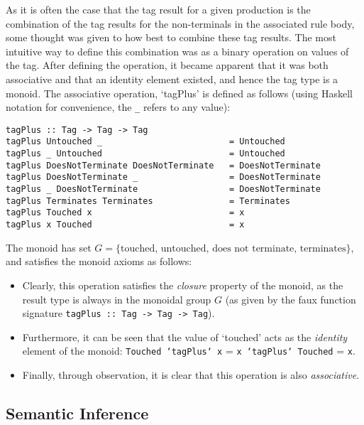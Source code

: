 As it is often the case that the tag result for a given production is the combination of the tag results for the non-terminals in the associated rule body, some thought was given to how best to combine these tag results.
The most intuitive way to define this combination was as a binary operation on values of the tag. 
After defining the operation, it became apparent that it was both associative and that an identity element existed, and hence the tag type is a \gls{monoid}.
The associative operation, `tagPlus' is defined as follows (using Haskell notation for convenience, the \texttt{_} refers to any value):
\begin{verbatim}
tagPlus :: Tag -> Tag -> Tag
tagPlus Untouched _                         = Untouched
tagPlus _ Untouched                         = Untouched
tagPlus DoesNotTerminate DoesNotTerminate   = DoesNotTerminate
tagPlus DoesNotTerminate _                  = DoesNotTerminate
tagPlus _ DoesNotTerminate                  = DoesNotTerminate
tagPlus Terminates Terminates               = Terminates
tagPlus Touched x                           = x
tagPlus x Touched                           = x
\end{verbatim}

The monoid has set $G = \{\text{touched, untouched, does not terminate, terminates}\}$, and satisfies the monoid axioms as follows:
\begin{itemize}
    \item Clearly, this operation satisfies the \textit{closure} property of the monoid, as the result type is always in the monoidal group $G$ (as given by the faux function signature \texttt{tagPlus :: Tag -> Tag -> Tag}).
    \item Furthermore, it can be seen that the value of `touched' acts as the \textit{identity} element of the monoid: \texttt{Touched `tagPlus` x} = \texttt{x `tagPlus` Touched} = \texttt{x}.
    \item Finally, through observation, it is clear that this operation is also \textit{associative}.
\end{itemize}



\subsection{Semantic Inference} %
\label{sub:semantic_inference}

